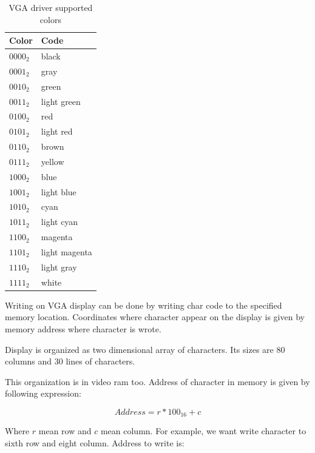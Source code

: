 \begin{table}[h]
    \centering
    \begin{tabular}{|l|l|}
        \hline
        \textbf{Color} & \textbf{Code}  \\ \hline
        $0000_{2}$     & black          \\ \hline
        $0001_{2}$     & gray           \\ \hline
        $0010_{2}$     & green          \\ \hline
        $0011_{2}$     & light green    \\ \hline
        $0100_{2}$     & red            \\ \hline
        $0101_{2}$     & light red      \\ \hline
        $0110_{2}$     & brown          \\ \hline
        $0111_{2}$     & yellow         \\ \hline
        $1000_{2}$     & blue           \\ \hline
        $1001_{2}$     & light blue     \\ \hline
        $1010_{2}$     & cyan           \\ \hline
        $1011_{2}$     & light cyan     \\ \hline
        $1100_{2}$     & magenta        \\ \hline
        $1101_{2}$     & light magenta  \\ \hline
        $1110_{2}$     & light gray     \\ \hline
        $1111_{2}$     & white          \\ \hline
    \end{tabular}
    \caption{VGA driver supported colors}
    \label{tab:vga_collors_codes}
\end{table}

Writing on VGA display can be done by writing char code to the specified memory
location. Coordinates where character appear on the display is given by memory
address where character is wrote.

Display is organized as two dimensional array of characters. Its sizes are 80
columns and 30 lines of characters.

This organization is in video ram too. Address of character in memory is given
by following expression:

$$
    Address = r * 100_{16} + c
$$

Where $r$ mean row and $c$ mean column. For example, we want write character to
sixth row and eight column. Address to write is:

